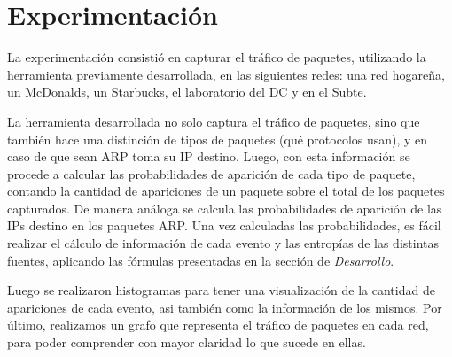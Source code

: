 \section{Experimentación}
La experimentación consistió en capturar el tráfico de paquetes, utilizando la herramienta previamente desarrollada, en las siguientes redes: una red hogareña, un McDonalds, un Starbucks, el laboratorio del DC y en el Subte.

La herramienta desarrollada no solo captura el tráfico de paquetes, sino que también hace una distinción de tipos de paquetes (qué protocolos usan), y en caso de que sean ARP toma su IP destino. Luego, con esta información se procede a calcular las probabilidades de aparición de cada tipo de paquete, contando la cantidad de apariciones de un paquete sobre el total de los paquetes capturados. De manera análoga se calcula las probabilidades de aparición de las IPs destino en los paquetes ARP. Una vez calculadas las probabilidades, es fácil realizar el cálculo de información de cada evento y las entropías de las distintas fuentes, aplicando las fórmulas presentadas en la sección de \textit{Desarrollo}.

Luego se realizaron histogramas para tener una visualización de la cantidad de apariciones de cada evento, asi también como la información de los mismos.
Por último, realizamos un grafo que representa el tráfico de paquetes en cada red, para poder comprender con mayor claridad lo que sucede en ellas.

\newpage


\newpage


\newpage


\newpage


\newpage


\newpage


